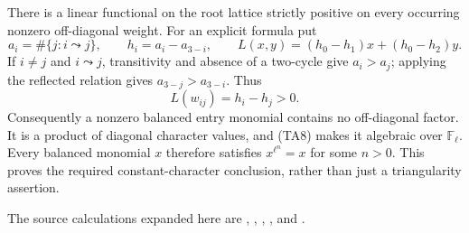 There is a linear functional on the root lattice strictly
positive on every occurring nonzero off-diagonal weight.
For an explicit formula put
\[
 a_i=\#\{j:i\leadsto j\},\qquad h_i=a_i-a_{3-i},\qquad
 L(x,y)=(h_0-h_1)x+(h_0-h_2)y .
\]
If \(i\ne j\) and \(i\leadsto j\), transitivity and absence of
a two-cycle give \(a_i>a_j\); applying the reflected relation
gives \(a_{3-j}>a_{3-i}\).
Thus
\[
                  L(w_{ij})=h_i-h_j>0.                  \tag{TA9}
\]
Consequently a nonzero balanced entry monomial contains no
off-diagonal factor. It is a product of diagonal character
values, and (TA8) makes it algebraic over \(\mathbb F_\ell\).
Every balanced monomial \(x\) therefore satisfies
\(x^{\ell^n}=x\) for some \(n>0\).
This proves the required constant-character conclusion,
rather than just a triangularity assertion.

The source calculations expanded here are
, ,
,
, and .

